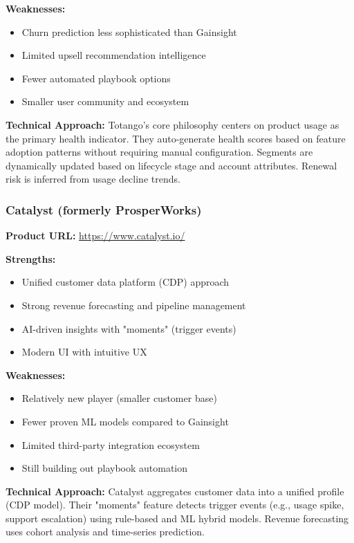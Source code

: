 \documentclass[12pt,a4paper]{article}
\begin{document}
\textbf{Weaknesses:}
\begin{itemize}
    \item Churn prediction less sophisticated than Gainsight
    \item Limited upsell recommendation intelligence
    \item Fewer automated playbook options
    \item Smaller user community and ecosystem
\end{itemize}

\textbf{Technical Approach:} Totango’s core philosophy centers on product usage as the primary health indicator. They auto-generate health scores based on feature adoption patterns without requiring manual configuration. Segments are dynamically updated based on lifecycle stage and account attributes. Renewal risk is inferred from usage decline trends.

\subsubsection{Catalyst (formerly ProsperWorks)}
\textbf{Product URL:} \url{https://www.catalyst.io/}

\textbf{Strengths:}
\begin{itemize}
    \item Unified customer data platform (CDP) approach
    \item Strong revenue forecasting and pipeline management
    \item AI-driven insights with "moments" (trigger events)
    \item Modern UI with intuitive UX
\end{itemize}

\textbf{Weaknesses:}
\begin{itemize}
    \item Relatively new player (smaller customer base)
    \item Fewer proven ML models compared to Gainsight
    \item Limited third-party integration ecosystem
    \item Still building out playbook automation
\end{itemize}

\textbf{Technical Approach:} Catalyst aggregates customer data into a unified profile (CDP model). Their "moments" feature detects trigger events (e.g., usage spike, support escalation) using rule-based and ML hybrid models. Revenue forecasting uses cohort analysis and time-series prediction.
\end{document}

